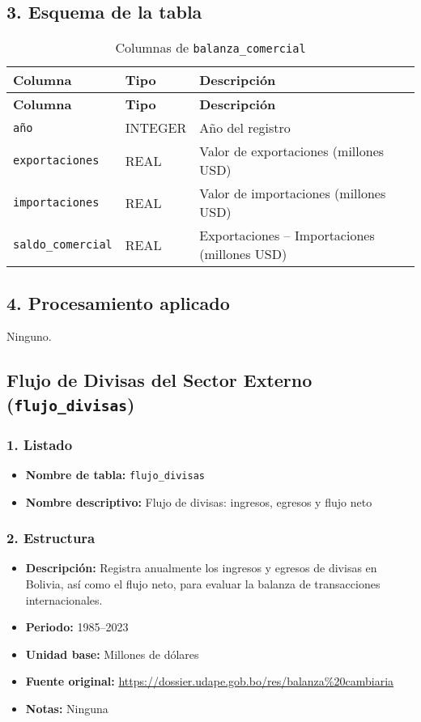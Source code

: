 \documentclass[12pt,a4paper]{article}
\begin{document}
\subsection*{3. Esquema de la tabla}
\begin{longtable}{@{}lll@{}}
\caption{Columnas de \texttt{balanza\_comercial}}\\
\toprule
\textbf{Columna} & \textbf{Tipo} & \textbf{Descripción} \\
\midrule
\endfirsthead
\toprule
\textbf{Columna} & \textbf{Tipo} & \textbf{Descripción} \\
\midrule
\endhead
\bottomrule
\endfoot
\texttt{año}              & INTEGER & Año del registro \\
\texttt{exportaciones}    & REAL    & Valor de exportaciones (millones USD) \\
\texttt{importaciones}    & REAL    & Valor de importaciones (millones USD) \\
\texttt{saldo\_comercial} & REAL    & Exportaciones -- Importaciones (millones USD) \\
\end{longtable}

\subsection*{4. Procesamiento aplicado}
Ninguno.

\newpage
\subsection{Flujo de Divisas del Sector Externo (\texttt{flujo\_divisas})}

\subsubsection*{1. Listado}
\begin{itemize}
  \item \textbf{Nombre de tabla:} \texttt{flujo\_divisas}
  \item \textbf{Nombre descriptivo:} Flujo de divisas: ingresos, egresos y flujo neto
\end{itemize}

\subsubsection*{2. Estructura}
\begin{itemize}
  \item \textbf{Descripción:} Registra anualmente los ingresos y egresos de divisas en Bolivia, así como el flujo neto, para evaluar la balanza de transacciones internacionales.
  \item \textbf{Periodo:} 1985--2023
  \item \textbf{Unidad base:} Millones de dólares
  \item \textbf{Fuente original:} \url{https://dossier.udape.gob.bo/res/balanza%20cambiaria}
  \item \textbf{Notas:} Ninguna
\end{itemize}
\end{document}
